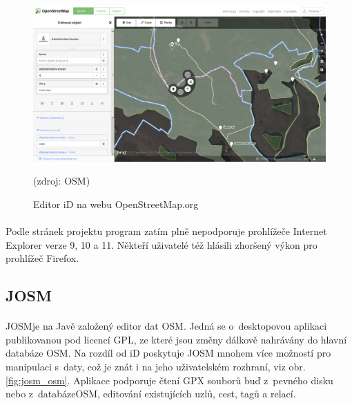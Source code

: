 \documentclass[11pt,a4paper,titlepage,oneside]{book}
\begin{document}
		\begin{figure}[!h]
			\begin{center}
				\includegraphics[width=12cm]{obrazky/iD_osm.png}
				\caption{Editor iD na webu OpenStreetMap.org} (zdroj: \ac{OSM}\cite{osm_edit})
				\label{fig:iD_osm}
			\end{center}
		\end{figure}

			\paragraph{} Podle stránek projektu\cite{wiki_iD} program zatím plně nepodporuje prohlížeče Internet Explorer verze 9, 10 a 11. Někteří uživatelé též hlásili zhoršený výkon pro prohlížeč Firefox.

		\subsection{JOSM}
			\paragraph{}\ac{JOSM}je na Javě založený editor dat \ac{OSM}. Jedná se o~desktopovou aplikaci publikovanou pod licencí \ac{GPL}, ze které jsou změny dálkově nahrávány do hlavní databáze \ac{OSM}\cite{wiki_josm}. Na rozdíl od iD poskytuje JOSM mnohem více možností pro manipulaci s~daty\cite{wiki_comparison}, což je znát i na jeho uživatelském rozhraní, viz obr. \ref{fig:josm_osm}. Aplikace podporuje čtení \ac{GPX} souborů buď z~pevného disku nebo z~databáze\acl{OSM}, editování existujících uzlů, cest, tagů a relací.

\end{document}
